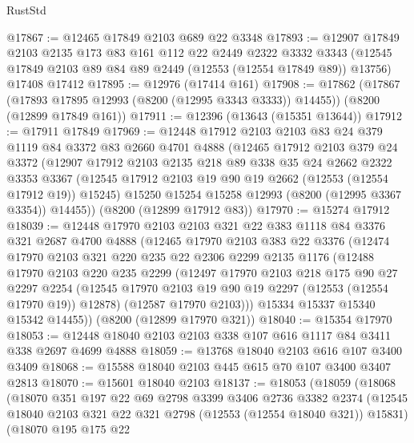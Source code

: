 \begin{lexlean}{RustStd}
\begin{coremodule}
@17867 := @12465 @17849 @2103 @689 @22 @3348
@17893 := @12907
    @17849
    @2103
    @2135
    @173
    @83
    @161
    @112
    @22
    @2449
    @2322
    @3332
    @3343
    (@12545 @17849 @2103 @89 @84 @89 @2449 (@12553 (@12554 @17849 @89)) @13756)
    @17408
    @17412
@17895 := @12976 (@17414 @161)
@17908 := @17862
    (@17867 (@17893 @17895 @12993 (@8200 (@12995 @3343 @3333)) @14455))
    (@8200 (@12899 @17849 @161))
@17911 := @12396 (@13643 (@15351 @13644))
@17912 := @17911 @17849
@17969 := @12448
    @17912
    @2103
    @2103
    @83
    @24
    @379
    @1119
    @84
    @3372
    @83
    @2660
    @4701
    @4888
    (@12465
      @17912
      @2103
      @379
      @24
      @3372
      (@12907
        @17912
        @2103
        @2135
        @218
        @89
        @338
        @35
        @24
        @2662
        @2322
        @3353
        @3367
        (@12545 @17912 @2103 @19 @90 @19 @2662 (@12553 (@12554 @17912 @19)) @15245)
        @15250
        @15254
        @15258
        @12993
        (@8200 (@12995 @3367 @3354))
        @14455))
    (@8200 (@12899 @17912 @83))
@17970 := @15274 @17912
@18039 := @12448
    @17970
    @2103
    @2103
    @321
    @22
    @383
    @1118
    @84
    @3376
    @321
    @2687
    @4700
    @4888
    (@12465
      @17970
      @2103
      @383
      @22
      @3376
      (@12474
        @17970
        @2103
        @321
        @220
        @235
        @22
        @2306
        @2299
        @2135
        @1176
        (@12488
          @17970
          @2103
          @220
          @235
          @2299
          (@12497
            @17970
            @2103
            @218
            @175
            @90
            @27
            @2297
            @2254
            (@12545 @17970 @2103 @19 @90 @19 @2297 (@12553 (@12554 @17970 @19)) @12878)
            (@12587 @17970 @2103)))
        @15334
        @15337
        @15340
        @15342
        @14455))
    (@8200 (@12899 @17970 @321))
@18040 := @15354 @17970
@18053 := @12448 @18040 @2103 @2103 @338 @107 @616 @1117 @84 @3411 @338 @2697 @4699 @4888
@18059 := @13768 @18040 @2103 @616 @107 @3400 @3409
@18068 := @15588 @18040 @2103 @445 @615 @70 @107 @3400 @3407 @2813
@18070 := @15601 @18040 @2103
@18137 := @18053
    (@18059
      (@18068
        (@18070
          @351
          @197
          @22
          @69
          @2798
          @3399
          @3406
          @2736
          @3382
          @2374
          (@12545 @18040 @2103 @321 @22 @321 @2798 (@12553 (@12554 @18040 @321)) @15831)
          (@18070
            @195
            @175
            @22

\end{coremodule}
\end{lexlean}
